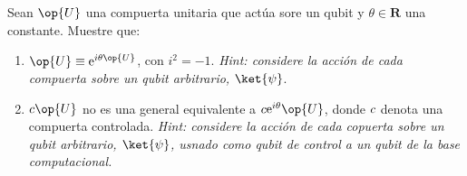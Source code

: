 \documentclass[./../main.tex]{subfiles}
\begin{document}
\section{}

Sean \(\op{U}\) una compuerta unitaria que actúa sore un qubit y \(\theta\in\bm{R}\) una constante. Muestre que:
\begin{enumerate}
	\item \(\op{U} \equiv \textrm{e}^{i\theta\op{U}}\), con \(i^{2} = -1\). \emph{Hint: considere la acción de cada compuerta sobre un qubit arbitrario, \(\ket{\psi}\)}.
	\item \(c\-\op{U}\) no es una general equivalente a \(c\-\textrm{e}^{i\theta}\op{U}\), donde \(c\-\) denota una compuerta controlada. \emph{Hint: considere la acción de cada copuerta sobre un qubit arbitrario, \(\ket{\psi}\), usnado como qubit de control a un qubit de la base computacional.}
\end{enumerate}
\end{document}
